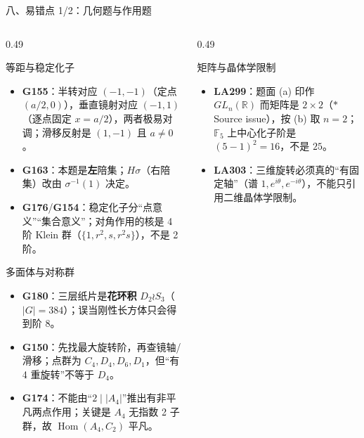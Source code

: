 \documentclass[aspectratio=169,10pt,fontset=none]{ctexbeamer}
\newcommand{\ex}[1]{\textcolor{accent}{\footnotesize\bfseries #1}}
\newcommand{\starpt}{\textcolor{accent}{\bfseries$\ast$}}
\begin{document}
\begin{frame}[t]{八、易错点 1/2：几何题与作用题}
  \label{sec:pitfalls1}
  \begin{columns}[T,onlytextwidth]
    \begin{column}{0.49\textwidth}
      \begin{alertblock}{\footnotesize 等距与稳定化子}
        \scriptsize
        \begin{itemize}\setlength{\itemsep}{1pt}
          \item \ex{G155}：半转对应 $(-1,-1)$（定点 $(a/2,0)$），垂直镜射对应 $(-1,1)$（逐点固定 $x=a/2$），两者极易对调；滑移反射是 $(1,-1)$ 且 $a\ne0$。
          \item \ex{G163}：本题是\textbf{左}陪集；$H\sigma$（右陪集）改由 $\sigma^{-1}(1)$ 决定。
          \item \ex{G176}/\ex{G154}：稳定化子分“点意义”“集合意义”；对角作用的核是 4 阶 Klein 群（$\{1,r^2,s,r^2s\}$），不是 2 阶。
        \end{itemize}
      \end{alertblock}
      \begin{alertblock}{\footnotesize 多面体与对称群}
        \scriptsize
        \begin{itemize}\setlength{\itemsep}{1pt}
          \item \ex{G180}：三层纸片是\textbf{花环积} $D_2\wr S_3$（$|G|=384$）；误当刚性长方体只会得到阶 $8$。
          \item \ex{G150}：先找最大旋转阶，再查镜轴/滑移；点群为 $C_4,D_4,D_6,D_1$，但“有 4 重旋转”不等于 $D_4$。
          \item \ex{G174}：不能由“$2\mid|A_4|$”推出有非平凡两点作用；关键是 $A_4$ 无指数 2 子群，故 $\operatorname{Hom}(A_4,C_2)$ 平凡。
        \end{itemize}
      \end{alertblock}
    \end{column}
    \begin{column}{0.49\textwidth}
      \begin{alertblock}{\footnotesize 矩阵与晶体学限制}
        \scriptsize
        \begin{itemize}\setlength{\itemsep}{1pt}
          \item \ex{LA299}：题面 (a) 印作 $GL_n(\mathbb R)$ 而矩阵是 $2\times2$（\starpt Source issue），按 (b) 取 $n=2$；$\mathbb F_5$ 上中心化子阶是 $(5-1)^2=16$，不是 $25$。
          \item \ex{LA303}：三维旋转必须真的“有固定轴”（谱 $1,e^{i\theta},e^{-i\theta}$），不能只引用二维晶体学限制。

\end{itemize}
\end{alertblock}
\end{column}
\end{columns}
\end{frame}
\end{document}
